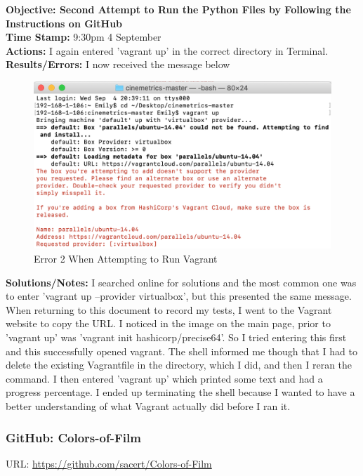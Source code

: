 \documentclass{article}
\begin{document}
\textbf{Objective: Second Attempt to Run the Python Files by Following the Instructions on GitHub}\\
\textbf{Time Stamp:} 9:30pm 4 September\\
\textbf{Actions:} I again entered 'vagrant up' in the correct directory in Terminal.\\
\textbf{Results/Errors:} I now received the message below\\
\begin{figure}[htp]
    \centering
    \includegraphics[width=12cm]{Vagrant_Image_2.png}
    \caption{Error 2 When Attempting to Run Vagrant}
\end{figure}

\textbf{Solutions/Notes:} I searched online for solutions and the most common one was to enter 'vagrant up --provider virtualbox', but this presented the same message. When returning to this document to record my tests, I went to the Vagrant website to copy the URL. I noticed in the image on the main page, prior to 'vagrant up' was 'vagrant init hashicorp/precise64'. So I tried entering this first and this successfully opened vagrant. The shell informed me though that I had to delete the existing Vagrantfile in the directory, which I did, and then I reran the command. I then entered 'vagrant up' which printed some text and had a progress percentage. I ended up terminating the shell because I wanted to have a better understanding of what Vagrant actually did before I ran it.\\

\subsubsection{GitHub: Colors-of-Film}
URL: \url{https://github.com/sacert/Colors-of-Film}\\
\end{document}
